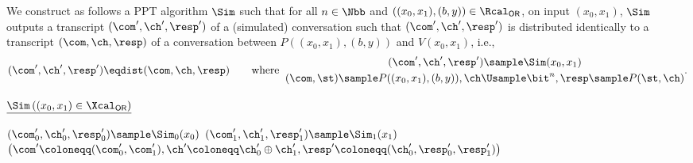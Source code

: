\begin{answer}
    We construct as follows a PPT algorithm $\Sim$ such that for all $n\in\Nbb$ and $((x_0, x_1), (b, y))\in\Rcal_\mathsf{OR}$, on input $(x_0, x_1)$, $\Sim$ outputs a transcript $(\com', \ch', \resp')$ of a (simulated) conversation such that $(\com', \ch', \resp')$ is distributed identically to a transcript $(\com, \ch, \resp)$ of a conversation between $P((x_0, x_1), (b,y))$ and $V(x_0, x_1)$, i.e.,
    \begin{equation}\label{eq:p5-3-1}
        (\com', \ch', \resp') \eqdist (\com, \ch, \resp)
        \qquad
        \textrm{where}
        \;\;
        \begin{gathered}
            (\com', \ch', \resp')\sample \Sim(x_0, x_1) \\
            (\com, \st)\sample P((x_0, x_1), (b,y)), \ch \Usample \bit^n, \resp \sample  P(\st, \ch)
        \end{gathered}.
    \end{equation}

    \begin{simplebox}
        \small
        \noindent
        $\underline{\Sim\left((x_0, x_1) \in\Xcal_\mathsf{OR}\right)}$
        \begin{algorithmic}[1]
            \State $(\com_0', \ch_0', \resp_0')\sample \Sim_0(x_0)$
            \State $(\com_1', \ch_1', \resp_1')\sample \Sim_1(x_1)$
            \State\Return $\left(\com'\coloneqq (\com_0', \com_1'), \ch'\coloneqq \ch_0'\oplus \ch_1', \resp'\coloneqq (\ch_0', \resp_0', \resp_1') \right)$
        \end{algorithmic}
    \end{simplebox}


\end{answer}
